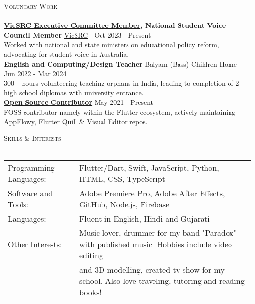 \documentclass[a4paper]{article}
\newcommand{\lineunder} {
    \vspace*{-8pt} \\
    \hspace*{-10pt} \hrulefill \\
}
\newcommand{\header} [1] {
    {\hspace*{-10pt}\vspace*{6pt} \textsc{#1}}
    \vspace*{-6pt} \lineunder
}
\begin{document}
\header{Voluntary Work}
\textbf{\href{https://vicsrc.org.au/about/executive-committee}{\ul{VicSRC Executive Committee Member}}, National Student Voice Council Member} \hfill \href{https://vicsrc.org.au/}{VicSRC} | Oct 2023 - Present\\
Worked with national and state ministers on educational policy reform, advocating for student voice in Australia.\\
\vspace*{1.5mm}
{\textbf{English and Computing/Design Teacher}} \hfill Balyam (Bass) Children Home | Jun 2022 - Mar 2024\\
300+ hours volunteering teaching orphans in India, leading to completion of 2 high school diplomas with university entrance. \\
\vspace*{1.5mm}
\href{https://github.com/garv-shah}{\textbf{\ul{Open Source Contributor}}} \hfill May 2021 - Present\\
FOSS contributor namely within the Flutter ecosystem, actively maintaining AppFlowy, Flutter Quill \& Visual Editor repos.\\
\vspace*{1.5mm}

\header{Skills \& Interests}
\begin{tabular}{ l l }
	Programming Languages: & Flutter/Dart, Swift, JavaScript, Python, HTML, CSS, TypeScript     \\
	Software and Tools:    & Adobe Premiere Pro, Adobe After Effects, GitHub, Node.js, Firebase \\
    Languages:    & Fluent in English, Hindi and Gujarati \\
    Other Interests:    & Music lover, drummer for my band "Paradox" with published music. Hobbies include video editing \\
                        & and 3D modelling, created tv show for my school. Also love traveling, tutoring and reading books! \\
\end{tabular}

\vspace*{-80pt}
\end{document}

